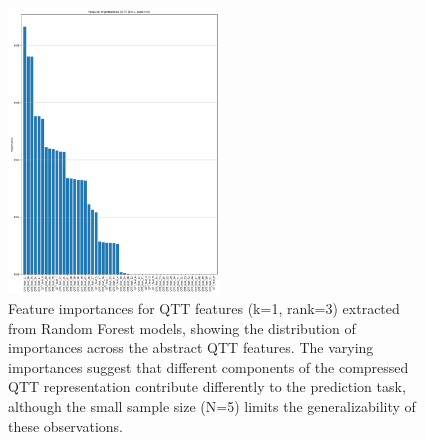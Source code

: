 \documentclass[twocolumn]{aastex631}
\begin{document}
\begin{figure}[h!]
    \centering
    \includegraphics[width=0.5\textwidth]{../input_files/plots/feature_importances_qtt_k1_r3_9_20250524-175150.png}
    \caption{Feature importances for QTT features (k=1, rank=3) extracted from Random Forest models, showing the distribution of importances across the abstract QTT features. The varying importances suggest that different components of the compressed QTT representation contribute differently to the prediction task, although the small sample size (N=5) limits the generalizability of these observations.
}
    \label{fig:feature_importances_qtt_k1_r3}
\end{figure}
\end{document}
